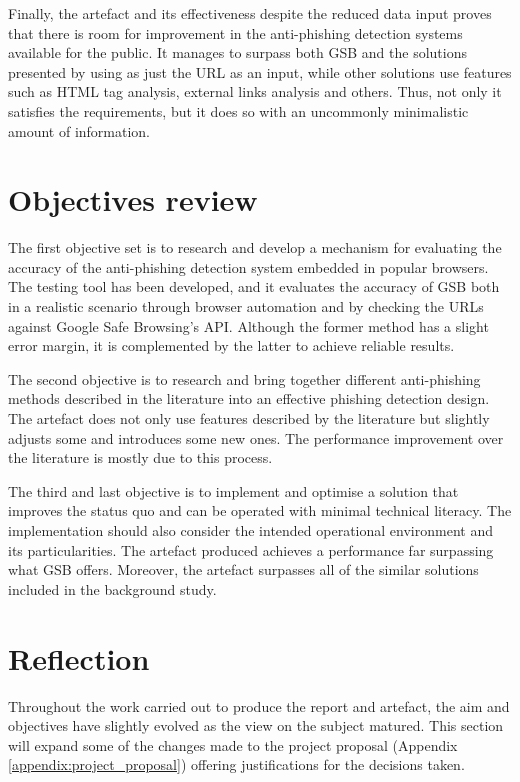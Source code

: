 Finally, the artefact and its effectiveness despite the reduced data input proves that there is room for improvement in the anti-phishing detection systems available for the public. It manages to surpass both GSB and the solutions presented by \cite{Adebowale} using as just the URL as an input, while other solutions use features such as HTML tag analysis, external links analysis and others. Thus, not only it satisfies the requirements, but it does so with an uncommonly minimalistic amount of information.

\section{Objectives review}
The first objective set is to research and develop a mechanism for evaluating the accuracy of the anti-phishing detection system embedded in popular browsers. The testing tool has been developed, and it evaluates the accuracy of GSB both in a realistic scenario through browser automation and by checking the URLs against Google Safe Browsing's API. Although the former method has a slight error margin, it is complemented by the latter to achieve reliable results.

The second objective is to research and bring together different anti-phishing methods described in the literature into an effective phishing detection design. The artefact does not only use features described by the literature but slightly adjusts some and introduces some new ones. The performance improvement over the literature is mostly due to this process.

The third and last objective is to implement and optimise a solution that improves the status quo and can be operated with minimal technical literacy. The implementation should also consider the intended operational environment and its particularities. The artefact produced achieves a performance far surpassing what GSB offers. Moreover, the artefact surpasses all of the similar solutions included in the background study.

\section{Reflection}
Throughout the work carried out to produce the report and artefact, the aim and objectives have slightly evolved as the view on the subject matured. This section will expand some of the changes made to the project proposal (Appendix \ref{appendix:project_proposal}) offering justifications for the decisions taken.

